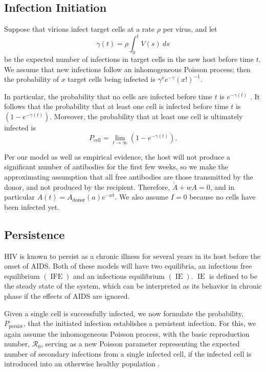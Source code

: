 \documentclass[]{elsarticle}
\newcommand{\Pcell}{P_{\text{cell}}}
\newcommand{\Adonor}{A_{\text{donor}}}
\newcommand{\IFE}{\operatorname{IFE}}
\newcommand{\IE}{\operatorname{IE}}
\newcommand{\BRN}{\mathcal{R}_0}
\theoremstyle{definition}
\begin{document}
\subsection{Infection Initiation}

Suppose that virions infect target cells at a rate $\rho$ per virus, and let
\begin{equation}
    \label{average infected number of target cells}
    \gamma(t) = \rho \int_0^t V(s) ~ds
\end{equation}
be the expected number of infections in target cells in the new host before time $t$. We assume that new infections follow an inhomogeneous Poisson process; then the probability of $x$ target cells being infected is $\gamma^x e^{-\gamma} (x!)^{-1}$.

In particular, the probability that no cells are infected before time $t$ is $e^{-\gamma(t)}$ \cite{AntibodyIntroduction}. It follows that the probability that at least one cell is infected before time $t$ is $\left(1 - e^{-\gamma(t)}\right)$. Moreover, the probability that at least one cell is ultimately infected is
\begin{equation}
    \label{eventual infection probability}
    \Pcell = \lim_{t \to \infty} \left(1 - e^{-\gamma(t)}\right).
\end{equation}

Per our model as well as empirical evidence, the host will not produce a significant number of antibodies for the first few weeks, so we make the approximating assumption that all free antibodies are those transmitted by the donor, and not produced by the recipient. Therefore, $\dot A + wA = 0$, and in particular $A(t) = \Adonor(a) e^{-wt}$. We also assume $I = 0$ because no cells have been infected yet.

\subsection{Persistence}

HIV is known to persist as a chronic illness for several years in its host before the onset of AIDS. Both of these models will have two equilibria, an infectious free equilibrium $(\IFE)$ and an infectious equilibrium $(\IE)$. $\IE$ is defined to be the steady state of the system, which can be interpreted as its behavior in chronic phase if the effects of AIDS are ignored.

Given a single cell is successfully infected, we now formulate the probability, $P_\text{persist}$, that the initiated infection establishes a persistent infection. For this, we again assume the inhomogeneous Poisson process, with the basic reproduction number, $\BRN$, serving as a new Poisson parameter representing the expected number of secondary infections from a single infected cell, if the infected cell is introduced into an otherwise healthy population \cite{DefiningBRN}.
\end{document}
